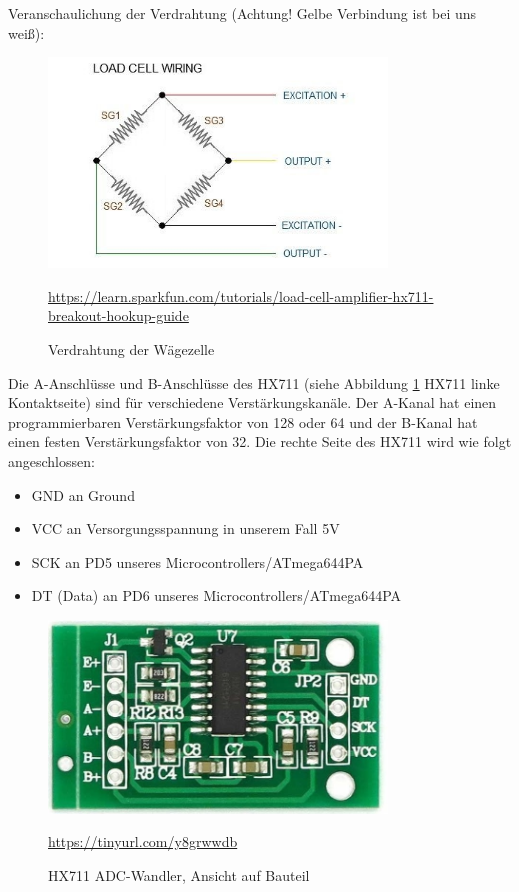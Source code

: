 \newpage
\noindent
Veranschaulichung der Verdrahtung (Achtung! Gelbe Verbindung ist bei uns weiß):\\
\begin{figure}[H]
    \center
    \includegraphics[width=9cm]{Bilder/waegezelle-verdrahtung.jpg}\\
    \caption{Verdrahtung der Wägezelle }
    \begin{flushleft} \quelle\url{https://learn.sparkfun.com/tutorials/load-cell-amplifier-hx711-breakout-hookup-guide} \end{flushleft}
\end{figure}
\noindent
Die A-Anschlüsse und B-Anschlüsse des HX711 (siehe Abbildung \ref{fig:waegezelle-adc} HX711 linke Kontaktseite) sind für verschiedene Verstärkungskanäle. Der A-Kanal hat einen programmierbaren Verstärkungsfaktor von 128 oder 64 und der B-Kanal hat einen festen Verstärkungsfaktor von 32.
\newpage
Die rechte Seite des HX711 wird wie folgt angeschlossen: 
\begin{itemize}
    \item GND an Ground 
    \item VCC an Versorgungsspannung in unserem Fall 5V 
    \item SCK an PD5 unseres Microcontrollers/ATmega644PA 
    \item DT (Data) an PD6 unseres Microcontrollers/ATmega644PA 
\end{itemize}
\begin{figure}[H]
    \center
    \includegraphics[width=9cm]{Bilder/waegezelle-adc.jpg}\\
    \caption{HX711 ADC-Wandler, Ansicht auf Bauteil}
    \quelle\url{https://tinyurl.com/y8grwwdb}
    \label{fig:waegezelle-adc}
\end{figure}
